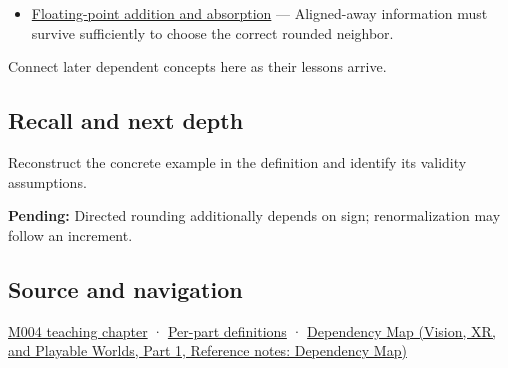 \hypertarget{appendix-b572b631069b-used-by}{}

\begin{itemize}
\tightlist
\item
  \hyperref[appendix-a1b1b4580dfd]{Floating-point addition and absorption} --- Aligned-away information must survive sufficiently to choose the correct rounded neighbor.
\end{itemize}

Connect later dependent concepts here as their lessons arrive.

\subsection{Recall and next depth}\label{appendix-b572b631069b-recall-and-next-depth}

\hypertarget{appendix-b572b631069b-recall-and-next-depth}{}

Reconstruct the concrete example in the definition and identify its validity assumptions.

\textbf{Pending:} Directed rounding additionally depends on sign; renormalization may follow an increment.

\subsection{Source and navigation}\label{appendix-b572b631069b-source-and-navigation}

\hypertarget{appendix-b572b631069b-source-and-navigation}{}

\hyperref[01-foundations-i-ch001-a-stretching-ruler-for-real-valued-quantities]{M004 teaching chapter} · \hyperref[appendix-fd090d982a15-m004---parts-61-76]{Per-part definitions} · \href{../07-Vision-XR-and-Playable-Worlds-P01/main.pdf\#nameddest=appendix-4ad47bdd269a}{Dependency Map (Vision, XR, and Playable Worlds, Part 1, Reference notes: Dependency Map)}
